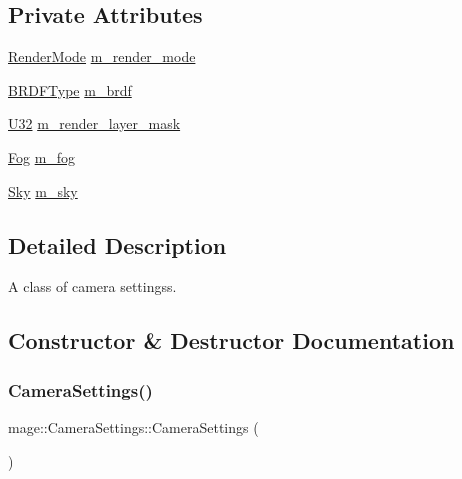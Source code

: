 \subsection*{Private Attributes}
\begin{DoxyCompactItemize}
\item 
\hyperlink{namespacemage_a9d24b35ed0bdecf8535e2b91fe0eebba}{Render\+Mode} \hyperlink{classmage_1_1_camera_settings_aa4d5139b4e8668c58507ead30812c84b}{m\+\_\+render\+\_\+mode}
\item 
\hyperlink{namespacemage_af1044f87544bc38427766a8c795d2f26}{B\+R\+D\+F\+Type} \hyperlink{classmage_1_1_camera_settings_ac6a51ea7c770af79de4f97b53cab83b7}{m\+\_\+brdf}
\item 
\hyperlink{namespacemage_a41c104c036fba3756a74e19f793eeaa1}{U32} \hyperlink{classmage_1_1_camera_settings_ad27594c8dc755e0dd8ca55564a4dff8b}{m\+\_\+render\+\_\+layer\+\_\+mask}
\item 
\hyperlink{classmage_1_1_fog}{Fog} \hyperlink{classmage_1_1_camera_settings_aef4d9aa95d6fe74fc241edab6de8bd3f}{m\+\_\+fog}
\item 
\hyperlink{classmage_1_1_sky}{Sky} \hyperlink{classmage_1_1_camera_settings_a04d1f51641e049d027cce65f596d33cc}{m\+\_\+sky}
\end{DoxyCompactItemize}


\subsection{Detailed Description}
A class of camera settingss. 

\subsection{Constructor \& Destructor Documentation}
\hypertarget{classmage_1_1_camera_settings_aaade0b72e225ace41e903fcf8108094c}{}\label{classmage_1_1_camera_settings_aaade0b72e225ace41e903fcf8108094c} 
\subsubsection{\texorpdfstring{Camera\+Settings()}{CameraSettings()}\hspace{0.1cm}{\footnotesize\ttfamily [1/3]}}
{\footnotesize\ttfamily mage\+::\+Camera\+Settings\+::\+Camera\+Settings (\begin{DoxyParamCaption}{ }\end{DoxyParamCaption})\hspace{0.3cm}{\ttfamily [noexcept]}}

